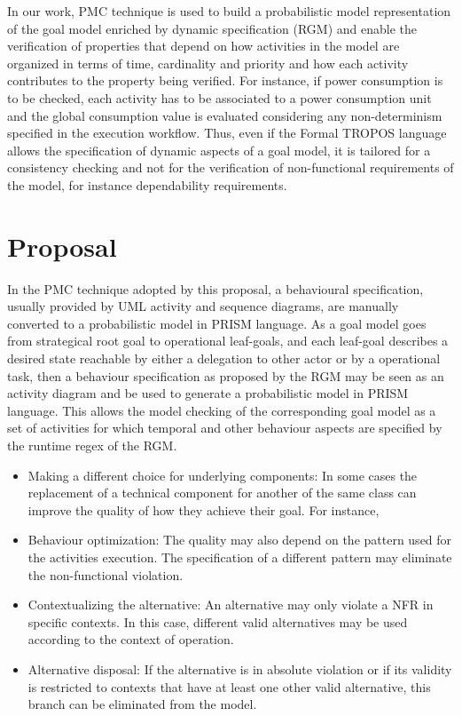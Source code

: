 In our work, PMC technique is used to build a probabilistic model representation of the goal model enriched by dynamic specification (RGM) and enable the verification of properties that depend on how activities in the model are organized in terms of time, cardinality and priority and how each activity contributes to the property being verified. For instance, if power consumption is to be checked, each activity has to be associated to a power consumption unit and the global consumption value is evaluated considering any non-determinism specified in the execution workflow. Thus, even if the Formal TROPOS language allows the specification of dynamic aspects of a goal model, it is tailored for a consistency checking and not for the verification of non-functional requirements of the model, for instance dependability requirements.

\chapter{Proposal}\label{ch_proposal}

In the PMC technique adopted by this proposal, a behavioural specification, usually provided by UML activity and sequence diagrams, are manually converted to a probabilistic model in PRISM language. As a goal model goes from strategical root goal to operational leaf-goals, and each leaf-goal describes a desired state reachable by either a delegation to other actor or by a operational task, then a behaviour specification as proposed by the RGM may be seen as an activity diagram and be used to generate a probabilistic model in PRISM language. This allows the model checking of the corresponding goal model as a set of activities for which temporal and other behaviour aspects are specified by the runtime regex of the RGM.


\begin{itemize}

\item Making a different choice for underlying components: In some cases the replacement of a technical component for another of the same class can improve the quality of how they achieve their goal. For instance,
\medskip

\item Behaviour optimization: The quality may also depend on the pattern used for the activities execution. The specification of a different pattern may eliminate the non-functional violation. 
\medskip

\item Contextualizing the alternative: An alternative may only violate a NFR in specific contexts. In this case, different valid alternatives may be used according to the context of operation.
\medskip

\item Alternative disposal: If the alternative is in absolute violation or if its validity is restricted to contexts that have at least one other valid alternative, this branch can be eliminated from the model.

\end{itemize}

